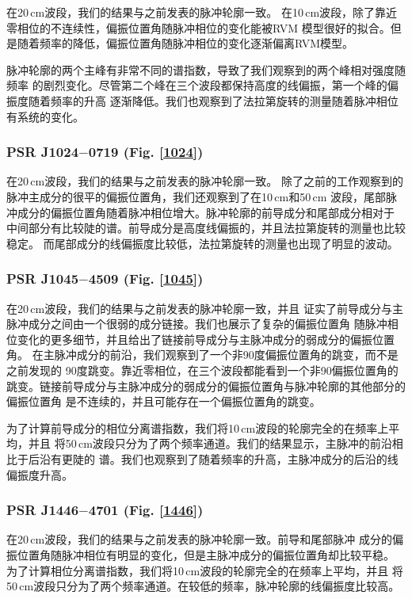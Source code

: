 在20\,cm波段，我们的结果与之前发表的脉冲轮廓一致\supercite{1022Kramer99,Stairs99,Ord04,Yan11a}。
在10\,cm波段，除了靠近零相位的不连续性，偏振位置角随脉冲相位的变化能被RVM
模型很好的拟合。但是随着频率的降低，偏振位置角随脉冲相位的变化逐渐偏离RVM模型。

脉冲轮廓的两个主峰有非常不同的谱指数，导致了我们观察到的两个峰相对强度随频率
的剧烈变化。尽管第二个峰在三个波段都保持高度的线偏振，第一个峰的偏振度随着频率的升高
逐渐降低。我们也观察到了法拉第旋转的测量随着脉冲相位有系统的变化。

\subsubsection{PSR J1024$-$0719 (Fig. \ref{1024})}

在20\,cm波段，我们的结果与之前发表的脉冲轮廓一致\supercite{Ord04,Yan11a}。
除了之前的工作观察到的脉冲主成分的很平的偏振位置角，我们还观察到了在10\,cm和50\,cm
波段，尾部脉冲成分的偏振位置角随着脉冲相位增大。脉冲轮廓的前导成分和尾部成分相对于
中间部分有比较陡的谱。前导成分是高度线偏振的，并且法拉第旋转的测量也比较稳定。
而尾部成分的线偏振度比较低，法拉第旋转的测量也出现了明显的波动。

\subsubsection{PSR J1045$-$4509 (Fig. \ref{1045})}

在20\,cm波段，我们的结果与之前发表的脉冲轮廓一致\supercite{Ord04,Yan11a}，并且
证实了前导成分与主脉冲成分之间由一个很弱的成分链接。我们也展示了复杂的偏振位置角
随脉冲相位变化的更多细节，并且给出了链接前导成分与主脉冲成分的弱成分的偏振位置角。
在主脉冲成分的前沿，我们观察到了一个非90度偏振位置角的跳变，而不是之前发现的
90度跳变\supercite{Yan11a}。靠近零相位，在三个波段都能看到一个非90偏振位置角的
跳变。链接前导成分与主脉冲成分的弱成分的偏振位置角与脉冲轮廓的其他部分的偏振位置角
是不连续的，并且可能存在一个偏振位置角的跳变。

为了计算前导成分的相位分离谱指数，我们将10\,cm波段的轮廓完全的在频率上平均，并且
将50\,cm波段只分为了两个频率通道。我们的结果显示，主脉冲的前沿相比于后沿有更陡的
谱。我们也观察到了随着频率的升高，主脉冲成分的后沿的线偏振度升高。


\subsubsection{PSR J1446$-$4701 (Fig. \ref{1446})}

在20\,cm波段，我们的结果与之前发表的脉冲轮廓一致\supercite{Keith12}。前导和尾部脉冲
成分的偏振位置角随脉冲相位有明显的变化，但是主脉冲成分的偏振位置角却比较平稳。
为了计算相位分离谱指数，我们将10\,cm波段的轮廓完全的在频率上平均，并且
将50\,cm波段只分为了两个频率通道。在较低的频率，脉冲轮廓的线偏振度比较高。

